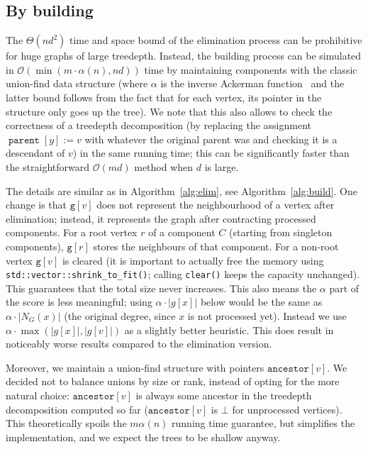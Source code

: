 \documentclass{timgad}
\newcommand{\Oh}{\ensuremath{\mathcal{O}}}
\DeclareMathOperator{\parent}{\texttt{parent}}
\begin{document}
\subsection{By building}
The $\Theta(nd^2)$ time and space bound of the elimination process can be prohibitive for huge graphs of large treedepth.
Instead, the building process can be simulated in $\Oh(\min(m \cdot \alpha(n), n d))$ time by maintaining components with the classic union-find data structure (where $\alpha$ is the inverse Ackerman function~\cite{TarjanL84} and the latter bound follows from the fact that for each vertex, its pointer in the structure only goes up the tree).
We note that this also allows to check the correctness of a treedepth decomposition (by replacing the assignment $\parent[y] := v$ with whatever the original parent was and checking it is a descendant of $v$) in the same running time;
this can be significantly faster than the straightforward $\Oh(md)$ method when $d$ is large.

The details are similar as in Algorithm~\ref{alg:elim}, see Algorithm~\ref{alg:build}.
One change is that $\texttt{g}[v]$ does not represent the neighbourhood of a vertex after elimination;
instead, it represents the graph after contracting processed components.
For a root vertex $r$ of a component $C$ (starting from singleton components), $\texttt{g}[r]$ stores the neighbours of that component.
For a non-root vertex $\texttt{g}[v]$ is cleared (it is important to actually free the memory using \texttt{std::vector::shrink\_to\_fit()}; calling \texttt{clear()} keeps the capacity unchanged).
This guarantees that the total size never increases.
This also means the $\alpha$ part of the score is less meaningful;
using $\alpha \cdot |g[x]|$ below would be the same as $\alpha \cdot |N_G(x)|$ (the original degree, since $x$ is not processed yet).
Instead we use $\alpha \cdot \max(|g[x]|, |g[v]|)$ as a slightly better heuristic.
This does result in noticeably worse results compared to the elimination version.

Moreover, we maintain a union-find structure with pointers $\texttt{ancestor}[v]$.
We decided not to balance unions by size or rank, instead of opting for the more natural choice:
$\texttt{ancestor}[v]$ is always some ancestor in the treedepth decomposition computed so far
($\texttt{ancestor}[v]$ is $\bot$ for unprocessed vertices).
This theoretically spoils the $m \alpha(n)$ running time guarantee, but simplifies the implementation, and we expect the trees to be shallow anyway.
\end{document}
